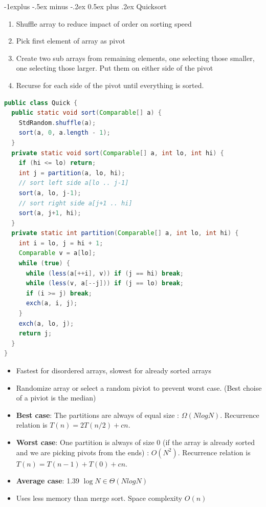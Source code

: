 \documentclass[letterpaper, 8pt]{extarticle}
\makeatletter
\renewcommand{\subsection}{\@startsection{subsection}{2}{0mm}%
                                {-1explus -.5ex minus -.2ex}%
                                {0.5ex plus .2ex}%
                                {\normalfont\small\bfseries}}
\makeatother
\begin{document}
\begin{multicols*}{4}
  \subsection{Quicksort}
  \begin{enumerate}
    \item Shuffle array to reduce impact of order on sorting speed
    \item Pick first element of array as pivot
    \item Create two sub arrays from remaining elements, one selecting those smaller,
          one selecting those larger. Put them on either side of the pivot
    \item Recurse for each side of the pivot until everything is sorted.
  \end{enumerate}
  \begin{lstlisting}[language=Java, breaklines=true, postbreak=\mbox{\textcolor{red}{$\hookrightarrow$}\space}]
public class Quick {
  public static void sort(Comparable[] a) {
    StdRandom.shuffle(a);
    sort(a, 0, a.length - 1);
  }
  private static void sort(Comparable[] a, int lo, int hi) {
    if (hi <= lo) return;
    int j = partition(a, lo, hi);
    // sort left side a[lo .. j-1]
    sort(a, lo, j-1);
    // sort right side a[j+1 .. hi]
    sort(a, j+1, hi);
  }
  private static int partition(Comparable[] a, int lo, int hi) {
    int i = lo, j = hi + 1;
    Comparable v = a[lo];
    while (true) {
      while (less(a[++i], v)) if (j == hi) break;
      while (less(v, a[--j])) if (j == lo) break;
      if (i >= j) break;
      exch(a, i, j);
    }
    exch(a, lo, j);
    return j;
  }
}
  \end{lstlisting}
  \begin{itemize}
    \item Fastest for disordered arrays, slowest for already sorted arrays
    \item Randomize array or select a random piviot to prevent worst case. (Best choise of a piviot is the median)
    \item \textbf{Best case}: The partitions are always of equal size : $\Omega(NlogN)$. Recurrence relation is $T(n) = 2T(n/2) + cn$.
    \item \textbf{Worst case}: One partition is always of size 0 (if the array is already sorted and we are picking pivots from the ends) : $O(N^2)$. Recurrence relation is $T(n) = T(n - 1) + T(0) + cn$.
    \item \textbf{Average case}: 1.39 $\log{N} \in \Theta(NlogN)$
    \item Uses less memory than merge sort. Space complexity $O(n)$
  \end{itemize}


\end{multicols*}
\end{document}
